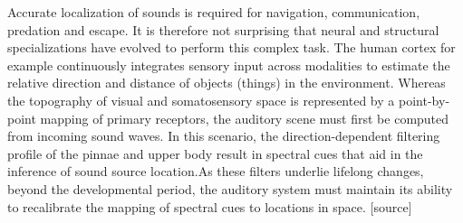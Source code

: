 Accurate localization of sounds is required for navigation, communication, predation and escape. It is therefore not surprising that neural and structural specializations have evolved to perform this complex task. The human cortex for example continuously integrates sensory input across modalities to estimate the relative direction and distance of objects (things) in the environment. Whereas the topography of visual and somatosensory space is represented by a point‐by‐point mapping of primary receptors, the auditory scene must first be computed from incoming sound waves. In this scenario, the direction-dependent filtering profile of the pinnae and upper body result in spectral cues that aid in the inference of sound source location.As these filters underlie lifelong changes, beyond the developmental period, the auditory system must maintain its ability to recalibrate the mapping of spectral cues to locations in space. [source] 
